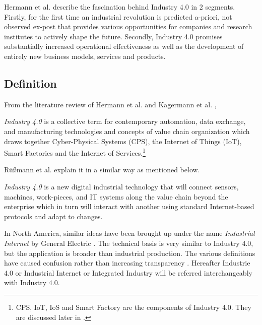 Hermann et al. \cite{IN4DESIGN} describe the fascination behind Industry 4.0 in 2 segments. Firstly, for the first time an industrial revolution is predicted a-priori, not observed ex-post that provides various opportunities for companies and research institutes to actively shape the future. Secondly, Industry 4.0 promises substantially increased operational effectiveness as well as the development of entirely new business models, services and products.
\subsection{Definition}
From the literature review of Hermann et al. \cite{IN4DESIGN} and Kagermann et al. \cite{VDINACH},
\begin{definition}
\textit{Industry 4.0} is a collective term for contemporary automation, data exchange, and manufacturing technologies and concepts of value chain organization which draws together Cyber-Physical Systems (\acs{CPS}), the Internet of Things (\acs{IoT}), Smart Factories and the Internet of Services.\footnote{\acs{CPS}, \acs{IoT}, \acs{IoS} and Smart Factory are the components of Industry 4.0. They are discussed later in .}
\end{definition}
Rüßmann et al. \cite{IN4BCG} explain it in a similar way as mentioned below.
\begin{definition}
\textit{Industry 4.0} is a new digital industrial technology that will connect sensors, machines, work-pieces, and \acs{IT} systems along the value chain beyond the enterprise which in turn will interact with another using standard Internet-based protocols and adapt to changes.
\end{definition}
In North America, similar ideas have been brought up under the name \textit{Industrial Internet} by General Electric \cite{INDUSINTERNET}. The technical basis is very similar to Industry 4.0, but the application is broader than industrial production. The various definitions have caused confusion rather than increasing transparency \cite{IN4HYPE}. Hereafter Industrie 4.0 or Industrial Internet or Integrated Industry will be referred interchangeably with Industry 4.0.
